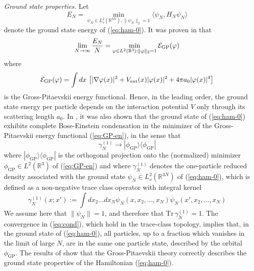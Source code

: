 \documentclass[11pt,a4paper,DIV11]{scrartcl}	%
\newcommand{\bR}{{\mathbb R}}
\newcommand{\tr}{\mbox{Tr}}
\newcommand{\cE}{{\cal E}}
\begin{document}
{\it Ground state properties.} Let \[ E_N = \min_{\psi_N \in L^2_s (\bR^{3N}), \| \psi_N \|_2 = 1} \langle \psi_N , H_N \psi_N \rangle \]
denote the ground state energy of (\ref{eq:ham-0}). It was proven in \cite{LSY} that
\[ \lim_{N \to \infty} \frac{E_N}{N} = \min_{\varphi \in L^2 (\bR^3) : \| \varphi \|_2 = 1} \cE_{\text{GP}} (\varphi) \]
where 
\begin{equation}\label{eq:GP-en} \cE_{\text{GP}} (\varphi) = \int dx \, \left[ |\nabla \varphi (x)|^2 + V_{\text{ext}} (x) |\varphi (x)|^2 + 4 \pi a_0 |\varphi (x)|^4 \right] \end{equation}
is the Gross-Pitaevskii energy functional. Hence, in the leading order, the ground state energy per particle depends on the interaction potential $V$ only through its scattering length $a_0$. In \cite{LS}, it was also shown that the ground state of (\ref{eq:ham-0}) exhibits complete Bose-Einstein condensation in the minimizer of the Gross-Pitaevskii energy functional (\ref{eq:GP-en}),
in the sense that 
\begin{equation}\label{eq:cond} \gamma_N^{(1)} \to | \phi_{\text{GP}} \rangle \langle \phi_{\text{GP}}| \end{equation}
where $|\phi_{\text{GP}} \rangle \langle \phi_{\text{GP}} |$ is the orthogonal projection onto the (normalized) 
minimizer $\phi_{\text{GP}} \in L^2 (\bR^3)$ of (\ref{eq:GP-en}) and where $\gamma^{(1)}_N$ denotes the one-particle reduced density associated with the ground state $\psi_N \in L^2_s (\bR^{3N})$ of (\ref{eq:ham-0}), which is defined as a non-negative trace class operator with integral kernel
\begin{equation}\label{eq:one-red} \gamma^{(1)}_N (x;x') := \int dx_2 \dots dx_N \psi_N (x , x_2, \dots  ,x_N) \overline{\psi}_N (x' , x_2 , \dots , x_N) \end{equation}
We assume here that $\| \psi_N \|  =1$, and therefore that $\tr \, \gamma^{(1)}_N = 1$. The convergence in (\ref{eq:cond}), which hold in the trace-class topology, implies that, in the ground state of (\ref{eq:ham-0}), all particles, up to a fraction which vanishes in the limit of large $N$, are in the same one particle state, described by the orbital $\phi_{\text{GP}}$. The results of \cite{LSY,LS} show that the Gross-Pitaevskii theory correctly describes the ground state properties of the Hamiltonian (\ref{eq:ham-0}). 

\bigskip
\end{document}
